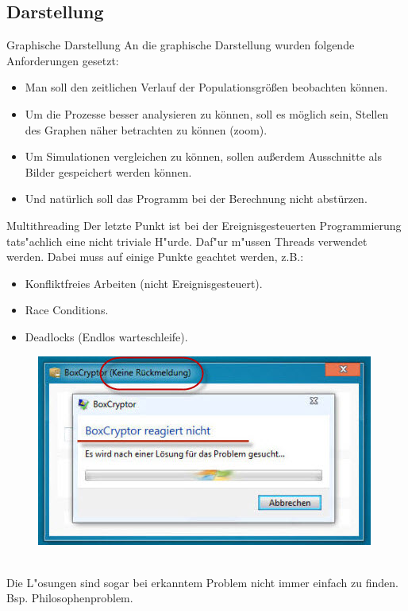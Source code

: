\documentclass{beamer}
\begin{document}
\subsection{Darstellung}
\begin{frame}{Graphische Darstellung}
	An die graphische Darstellung wurden folgende Anforderungen gesetzt:
	\begin{itemize}
		\item Man soll den zeitlichen Verlauf der Populationsgrößen beobachten \- können.
		\item Um die Prozesse besser analysieren zu können, soll es möglich sein, Stellen des Graphen näher betrachten zu können (zoom).
		\item Um Simulationen vergleichen zu können, sollen außerdem Ausschnitte als Bilder gespeichert werden können.
		\item Und natürlich soll das Programm bei der Berechnung nicht abstürzen.
	\end{itemize}
\end{frame}

\begin{frame}{Multithreading}
	Der letzte Punkt ist bei der Ereignisgesteuerten Programmierung tats"achlich eine nicht triviale H"urde. Daf"ur m"ussen Threads verwendet werden. Dabei muss auf einige Punkte geachtet werden, z.B.:\smallskip\\
	\begin{minipage}{0.49\textwidth}
	\begin{itemize}
		\item Konfliktfreies Arbeiten (nicht Ereignisgesteuert).
		\item Race Conditions.
		\item Deadlocks (Endlos warteschleife).
	\end{itemize}
	\end{minipage}
	\begin{minipage}{0.49\textwidth}
	\begin{figure}[H]
		\includegraphics[width=1\linewidth]{./Pictures/KeineRueckmeldung}
	\end{figure}
	\end{minipage}\\\smallskip
	Die L"osungen sind sogar bei erkanntem Problem nicht immer einfach zu finden. Bsp. Philosophenproblem.
\end{frame}
\end{document}
